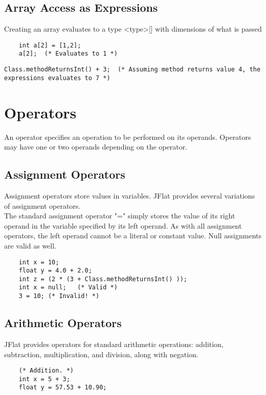 \begin{homeworkProblem}
	\subsection{Array Access as Expressions}
	Creating an array evaluates to a type <type>[] with dimensions of what is passed
	\begin{verbatim}
	int a[2] = [1,2];
	a[2];  (* Evaluates to 1 *)
	\end{verbatim}
	
	
	\begin{verbatim}
Class.methodReturnsInt() + 3;  (* Assuming method returns value 4, the expressions evaluates to 7 *)
	\end{verbatim}
	
	\section{Operators}
		
	An operator specifies an operation to be performed on its operands. Operators may have one or two operands depending on the operator. 
	
	\subsection{Assignment Operators}
		
	Assignment operators store values in variables. JFlat provides several variations of assignment operators.\\
		
	The standard assignment operator "=" simply stores the value of its right operand in the variable specified by its left operand. As with all assignment operators, the left operand cannot be a literal or constant value. Null assignments are valid as well.
		
	\begin{verbatim}
	int x = 10;
	float y = 4.0 + 2.0;
	int z = (2 * (3 + Class.methodReturnsInt() ));
	int x = null;   (* Valid *)
	3 = 10; (* Invalid! *)
	\end{verbatim}
	
	\subsection{Arithmetic Operators}
	
	JFlat provides operators for standard arithmetic operations: addition, subtraction, multiplication, and division, along with negation.
	
	\begin{verbatim}
	(* Addition. *)
	int x = 5 + 3;   
	float y = 57.53 + 10.90;
	

\end{verbatim}
\end{homeworkProblem}
